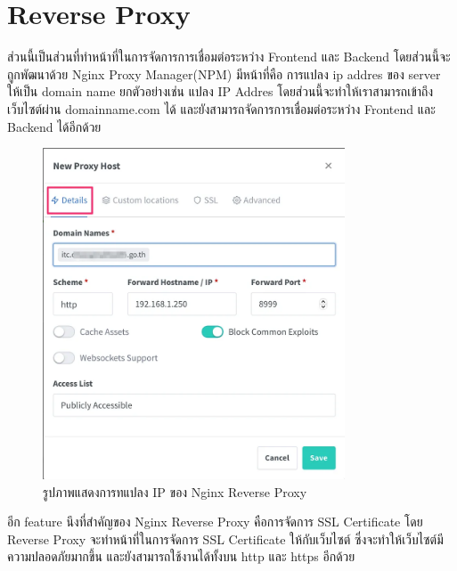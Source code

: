 \section{Reverse Proxy}
\hspace{1.27cm} \raggedright ส่วนนี้เป็นส่วนที่ทำหน้าที่ในการจัดการการเชื่อมต่อระหว่าง Frontend และ Backend โดยส่วนนี้จะถูกพัฒนาด้วย Nginx Proxy Manager(NPM)\cite{npm} มีหน้าที่คือ
การแปลง ip addres ของ server ให้เป็น domain name ยกตัวอย่างเช่น แปลง IP Addres
\enskip โดยส่วนนี้จะทำให้เราสามารถเข้าถึงเว็บไซต์ผ่าน domainname.com ได้ และยังสามารถจัดการการเชื่อมต่อระหว่าง Frontend และ Backend ได้อีกด้วย
\begin{figure}[H]
  \centering
  \includegraphics[width=0.8\textwidth]{pictures/npm1.png}
  \caption{รูปภาพแสดงการทแปลง IP ของ Nginx Reverse Proxy}
  \label{fig:reverse_proxy}
\end{figure}
\hspace{ 1.27cm}อีก feature นึงที่สำคัญของ Nginx Reverse Proxy คือการจัดการ SSL Certificate โดย Reverse Proxy จะทำหน้าที่ในการจัดการ SSL Certificate ให้กับเว็บไซต์ ซึ่งจะทำให้เว็บไซต์มีความปลอดภัยมากขึ้น และยังสามารถใช้งานได้ทั้งบน http และ https อีกด้วย

